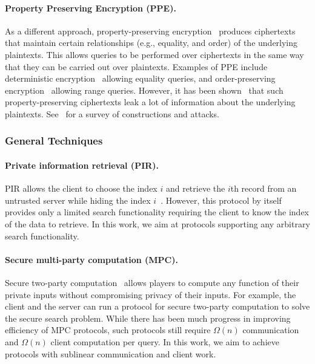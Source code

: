 \paragraph{Property Preserving Encryption (PPE).}
As a different approach, property-preserving encryption~\cite{EC:PanRou12} produces ciphertexts that maintain certain relationships (e.g., equality, and order) of the underlying plaintexts.  This allows queries to be performed over ciphertexts in the same way that they can be carried out over plaintexts.  Examples of PPE include deterministic encryption~\cite{C:BelBolONe07} allowing equality queries, and order-preserving encryption~\cite{EC:BCLO09, C:BolCheONe11} allowing range queries.  However, it has been shown~\cite{NDSS:IslKuzKan12, CCS:GMNRS16,SP:GSBNR17} that such property-preserving ciphertexts leak a lot of information about the underlying plaintexts.
See~\cite{SP:FVYSHG17} for a survey of constructions and attacks.

\subsubsection{General Techniques}
\paragraph{Private information retrieval (PIR).} PIR
allows the client to choose the index $i$ and retrieve the $i$th record
from an untrusted server while hiding the index
$i$~\cite{JACM:CKGS98}. However, this protocol by itself provides only a
limited search functionality requiring the client to know the index of the data to retrieve.  In this work, we
aim at protocols supporting any arbitrary search
functionality. 

\paragraph{Secure multi-party computation (MPC).}
Secure two-party computation~\cite{FOCS:Yao86,STOC:GolMicWig87} allows
players to compute any function of their private inputs without
compromising privacy of their inputs. For example, the client and the
server can run a protocol for secure two-party computation to solve the
secure search problem. 
%
While there has been much progress in improving efficiency of MPC
protocols, such protocols still require $\Omega(n)$ communication and $\Omega(n)$ client computation per query.  In this work, we aim to achieve protocols with sublinear communication and client work.


